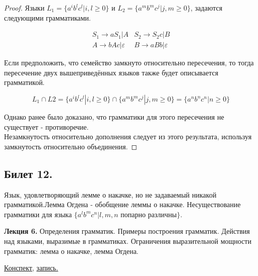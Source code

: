 \documentclass[a4paper]{article}
\newcommand{\mybox}{%
    \collectbox{%
        \setlength{\fboxsep}{1pt}%
        \fbox{\BOXCONTENT}%
    }%
}
\theoremstyle{indented}
\theoremstyle{definition}
\theoremstyle{remark}
\DeclareMathOperator{\ra}{\rightarrow}
\begin{document}
\begin{proof}
    Языки $L_1 = \{a^ib^lc^l | i,l \geq 0\}$ и $L_2 = \{a^mb^mc^j | j,m \geq 0\}$, задаются следующими грамматиками.

    \begin{equation*}
        \begin{matrix}
            S_1 \ra a S_1| A & S_2 \ra S_2c|B \\ 
            A \ra bAc | \varepsilon & B \ra aBb| \varepsilon
        \end{matrix}
    \end{equation*}

    Если предположить, что семейство замкнуто относительно пересечения, то тогда пересечение двух вышеприведённых языков также будет описывается грамматикой.

    \[
        L_1 \cap L2 = \{a^ib^lc^l |i,l\geq 0\}\cap \{a^mb^mc^j |j,m\geq 0 \}= \{a^nb^nc^n |n\geq 0\}
    \]
        
    Однако ранее было доказано, что грамматики для этого пересечения не существует - противоречие. \\ 

    Незамкнутость относительно дополнения следует из этого результата, используя замкнутость относительно объединения.
\end{proof}



\newpage 

\subsection{Билет 12.}

Язык, удовлетворяющий лемме о накачке, но не задаваемый никакой грамматикой.Лемма Огдена - обобщение леммы о накачке. Несуществование грамматики для языка $\{a^lb^mc^n|l, m, n \text{ попарно различны}\}$.

\hrulefill

\textbf{Лекция 6.} Определения грамматик. Примеры построения грамматик. Действия над языками, выразимые в грамматиках. Ограничения выразительной мощности грамматик: лемма о накачке, лемма Огдена.

\begin{flushright}
    \mybox{
        \href{https://users.math-cs.spbu.ru/~okhotin/teaching/tcs_fl_2021/okhotin_tcs_fl_2021_l6.pdf}{Конспект,}
        \href{https://disk.yandex.ru/d/knoQ44wLmGDwwQ/2021-2022%20учебный%20год%20(осенний%20семестр)/2%20курс/Теоретическая%20информатика/M2021-10-06_111624_1h43m_102.mp4}{запись.}
    }
\end{flushright}
\end{document}
